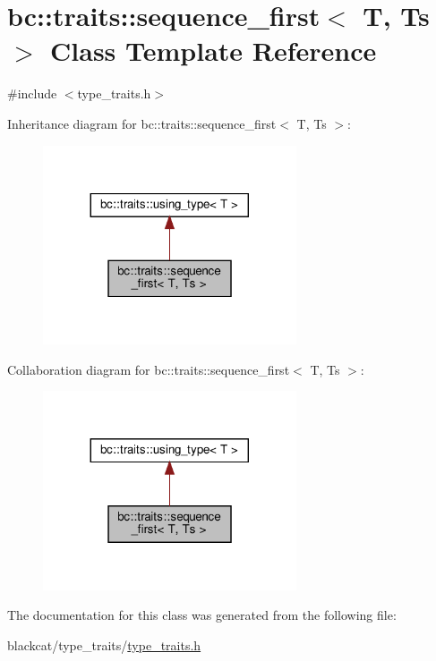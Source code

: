 \hypertarget{classbc_1_1traits_1_1sequence__first}{}\section{bc\+:\+:traits\+:\+:sequence\+\_\+first$<$ T, Ts $>$ Class Template Reference}
\label{classbc_1_1traits_1_1sequence__first}


{\ttfamily \#include $<$type\+\_\+traits.\+h$>$}



Inheritance diagram for bc\+:\+:traits\+:\+:sequence\+\_\+first$<$ T, Ts $>$\+:\nopagebreak
\begin{figure}[H]
\begin{center}
\leavevmode
\includegraphics[width=212pt]{classbc_1_1traits_1_1sequence__first__inherit__graph}
\end{center}
\end{figure}


Collaboration diagram for bc\+:\+:traits\+:\+:sequence\+\_\+first$<$ T, Ts $>$\+:\nopagebreak
\begin{figure}[H]
\begin{center}
\leavevmode
\includegraphics[width=212pt]{classbc_1_1traits_1_1sequence__first__coll__graph}
\end{center}
\end{figure}


The documentation for this class was generated from the following file\+:\begin{DoxyCompactItemize}
\item 
blackcat/type\+\_\+traits/\hyperlink{type__traits_2type__traits_8h}{type\+\_\+traits.\+h}\end{DoxyCompactItemize}
